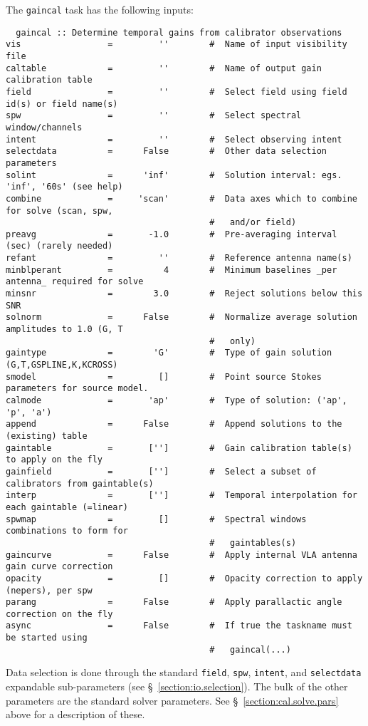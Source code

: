 {The {\tt gaincal} task has the following inputs:
\small
\begin{verbatim}
  gaincal :: Determine temporal gains from calibrator observations
vis                 =         ''        #  Name of input visibility file
caltable            =         ''        #  Name of output gain calibration table
field               =         ''        #  Select field using field id(s) or field name(s)
spw                 =         ''        #  Select spectral window/channels
intent              =         ''        #  Select observing intent
selectdata          =      False        #  Other data selection parameters
solint              =      'inf'        #  Solution interval: egs. 'inf', '60s' (see help)
combine             =     'scan'        #  Data axes which to combine for solve (scan, spw,
                                        #   and/or field)
preavg              =       -1.0        #  Pre-averaging interval (sec) (rarely needed)
refant              =         ''        #  Reference antenna name(s)
minblperant         =          4        #  Minimum baselines _per antenna_ required for solve
minsnr              =        3.0        #  Reject solutions below this SNR
solnorm             =      False        #  Normalize average solution amplitudes to 1.0 (G, T
                                        #   only)
gaintype            =        'G'        #  Type of gain solution (G,T,GSPLINE,K,KCROSS)
smodel              =         []        #  Point source Stokes parameters for source model.
calmode             =       'ap'        #  Type of solution: ('ap', 'p', 'a')
append              =      False        #  Append solutions to the (existing) table
gaintable           =       ['']        #  Gain calibration table(s) to apply on the fly
gainfield           =       ['']        #  Select a subset of calibrators from gaintable(s)
interp              =       ['']        #  Temporal interpolation for each gaintable (=linear)
spwmap              =         []        #  Spectral windows combinations to form for
                                        #   gaintables(s)
gaincurve           =      False        #  Apply internal VLA antenna gain curve correction
opacity             =         []        #  Opacity correction to apply (nepers), per spw
parang              =      False        #  Apply parallactic angle correction on the fly
async               =      False        #  If true the taskname must be started using
                                        #   gaincal(...)
\end{verbatim}
\normalsize
Data selection is done through the standard {\tt field}, {\tt spw},
{\tt intent}, and 
{\tt selectdata} expandable sub-parameters (see \S~\ref{section:io.selection}).
The bulk of the other parameters are the standard solver parameters.  See
\S~\ref{section:cal.solve.pars} above for a description of these.

}
